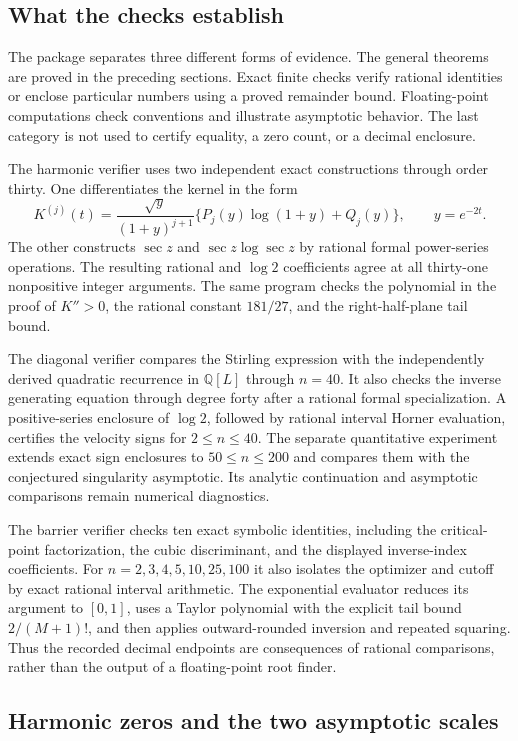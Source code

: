 \documentclass[11pt,a4paper]{article}
\theoremstyle{definition}
\theoremstyle{remark}
\numberwithin{equation}{section}
\begin{document}
\subsection{What the checks establish}

The package separates three different forms of evidence.
The general theorems are proved in the preceding sections.
Exact finite checks verify rational identities or enclose particular
numbers using a proved remainder bound. Floating-point computations
check conventions and illustrate asymptotic behavior. The last category
is not used to certify equality, a zero count, or a decimal enclosure.

The harmonic verifier uses two independent exact constructions through
order thirty. One differentiates the kernel in the form
\[
 K^{(j)}(t)=
 \frac{\sqrt y}{(1+y)^{j+1}}
 \{P_j(y)\log(1+y)+Q_j(y)\},\qquad y=e^{-2t}.
\]
The other constructs $\sec z$ and
$\sec z\log\sec z$ by rational formal power-series operations.
The resulting rational and $\log2$ coefficients agree at all thirty-one
nonpositive integer arguments. The same program checks the polynomial
in the proof of $K''>0$, the rational constant $181/27$, and the
right-half-plane tail bound.

The diagonal verifier compares the Stirling expression with the
independently derived quadratic recurrence in $\mathbb Q[L]$
through $n=40$. It also checks the inverse generating equation
through degree forty after a rational formal specialization.
A positive-series enclosure of $\log2$, followed by rational interval
Horner evaluation, certifies the velocity signs for $2\le n\le40$.
The separate quantitative experiment extends exact sign enclosures
to $50\le n\le200$ and compares them with the conjectured singularity
asymptotic. Its analytic continuation and asymptotic comparisons remain
numerical diagnostics.

The barrier verifier checks ten exact symbolic identities, including
the critical-point factorization, the cubic discriminant, and the displayed
inverse-index coefficients. For $n=2,3,4,5,10,25,100$ it also isolates
the optimizer and cutoff by exact rational interval arithmetic.
The exponential evaluator reduces its argument to $[0,1]$,
uses a Taylor polynomial with the explicit tail bound
$2/(M+1)!$, and then applies outward-rounded inversion and repeated
squaring. Thus the recorded decimal endpoints are consequences of
rational comparisons, rather than the output of a floating-point
root finder.

\subsection{Harmonic zeros and the two asymptotic scales}
\end{document}
